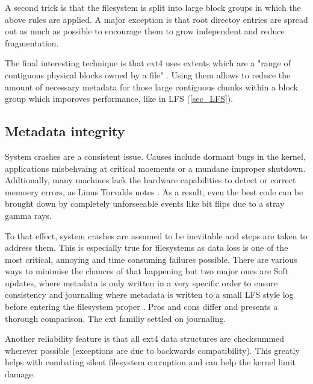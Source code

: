             A second trick is that the filesystem is split into large block
            groups in which the above rules are applied. A major exception is
            that root directoy entries are spread out as much as possible to
            encourage them to grow independent and reduce fragmentation.

            The final interesting technique is that ext4 uses extents which are
            a "range of contiguous physical blocks owned by a file"
            \cite{ext4_space_maps}. Using them allows to reduce the amount of
            necessary metadata for those large contiguous chunks within a block
            group which imporoves performance, like in LFS (\ref{sec_LFS}).

        \subsection{Metadata integrity}

            System crashes are a consistent issue. Causes include dormant bugs
            in the kernel, applications misbehvaing at critical moements or a
            mundane improper shutdown. Addtionally, many machines lack the
            hardware capabilities to detect or correct memoery errors, as Linus
            Torvalds notes \cite{Linus_ECC_rant}. As a result, even the best
            code can be brought down by completely unforseeable events like bit
            flips due to a stray gamma rays.

            To that effect, system crashes are assumed to be inevitable and
            steps are taken to address them. This is especially true for
            filesystems as data loss is one of the most critical, annoying and
            time consuming failures possible. There are various ways to
            minimise the chances of that happening but two major ones are Soft
            updates, where metadata is only written in a very specific order to
            ensure consistency \cite{soft_updates} and journaling where
            metadata is written to a small LFS style log before entering the
            filesystem proper \cite{ext4_docs}. Pros and cons differ and
            \citeauthor{journaling_vs_soft_updates} presents a thorough
            comparison. The ext familiy settled on journaling.

            Another reliability feature is that all ext4 data structures are
            checksummed wherever possible (exceptions are due to backwards
            compatibility). This greatly helps with combating silent
            filesystem corruption and can help the kernel limit damage.


